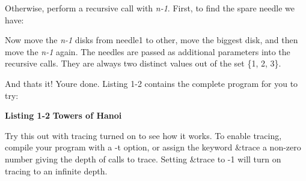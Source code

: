 Otherwise, perform a recursive call with \textit{n-1}. First, to find
the spare needle we have:


Now move the \textit{n-1} disks from \textsf{needle1} to \textsf{other},
move the biggest disk, and then move the \textit{n-1} again. The
needles are passed as additional parameters into the recursive calls.
They are always two distinct values out of the set \{1, 2, 3\}.


And that{\textquotesingle}s it! You{\textquotesingle}re done. Listing
1-2 contains the complete program for you to try:

\bigskip

{\sffamily\bfseries Listing 1-2}
{\sffamily\bfseries Towers of Hanoi}


Try this out with tracing turned on to see how it works.
To enable tracing, compile your program with a
\textsf{{}-t} option, or assign the keyword \textsf{\&trace} a non-zero
number giving the depth of calls to trace. Setting \textsf{\&trace} to
-1 will turn on tracing to an infinite depth.

